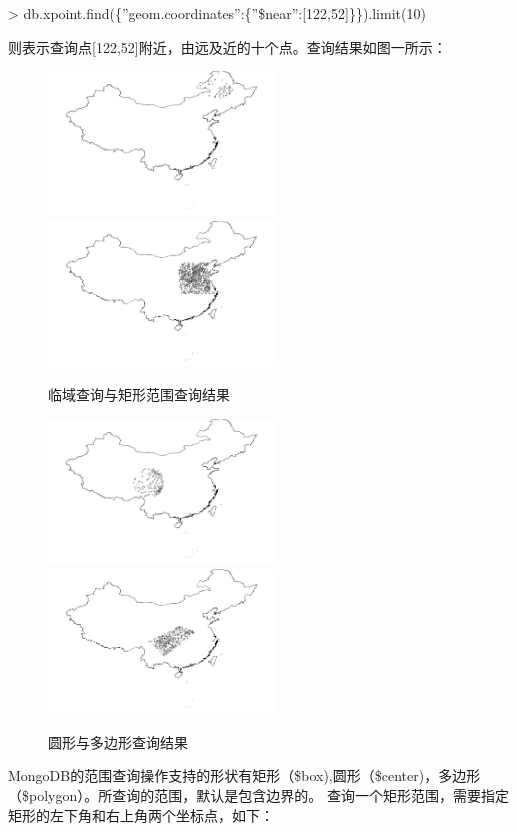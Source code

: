 \documentclass[master]{njnuthesis}
\begin{document}
\noindent > db.xpoint.find(\{''geom.coordinates'':\{''\$near'':[122,52]\}\}).limit(10)

\noindent 则表示查询点[122,52]附近，由远及近的十个点。查询结果如图一所示：
\begin{figure}[h]
\begin{center}
\includegraphics[angle=0,width=6cm]{pic//near.jpg}
\includegraphics[angle=0,width=6cm]{pic//box.jpg}
\caption{临域查询与矩形范围查询结果}
\label{fig:9}
\end{center}
\end{figure}
\begin{figure}[h]
\begin{center}
\includegraphics[angle=0,width=6cm]{pic//center.jpg}
\includegraphics[angle=0,width=6cm]{pic//polygon.jpg}
\caption{圆形与多边形查询结果}
\label{fig:11}
\end{center}
\end{figure}
MongoDB的范围查询操作支持的形状有矩形（\$box),圆形（\$center)，多边形（\$polygon）。所查询的范围，默认是包含边界的。
 查询一个矩形范围，需要指定矩形的左下角和右上角两个坐标点，如下：
\end{document}
